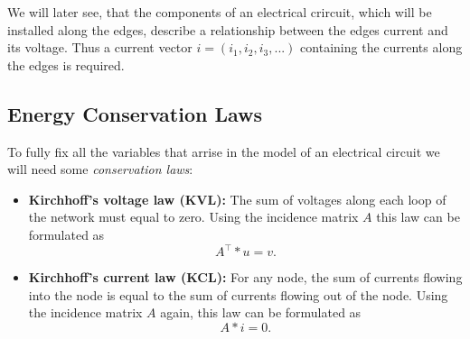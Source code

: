 \documentclass[11pt,titlepage]{article}
\begin{document}
			We will later see, that the components of an electrical crircuit, which will be installed along the edges, describe a relationship between the edges current and its voltage. Thus a current vector $i = (i_1, i_2, i_3, ...)$ containing the currents along the edges is required.
			
		\subsection{Energy Conservation Laws}
			To fully fix all the variables that arrise in the model of an electrical circuit we will need some \emph{conservation laws}:
			\begin{itemize}
				\item \textbf{Kirchhoff's voltage law (KVL):} \newline
					The sum of voltages along each loop of the network must equal to zero. Using the incidence matrix $A$ this law can be formulated as
					\begin{equation}
						\label{KVL}
						A^\top * u = v.
					\end{equation}
				\item \textbf{Kirchhoff's current law (KCL):} \newline
					For any node, the sum of currents flowing into the node is equal to the sum of currents flowing out of the node. Using the incidence matrix $A$ again, this law can be formulated as
					\begin{equation}
						\label{KCL}
						A * i = 0.
					\end{equation}
			\end{itemize}
		
\end{document}
